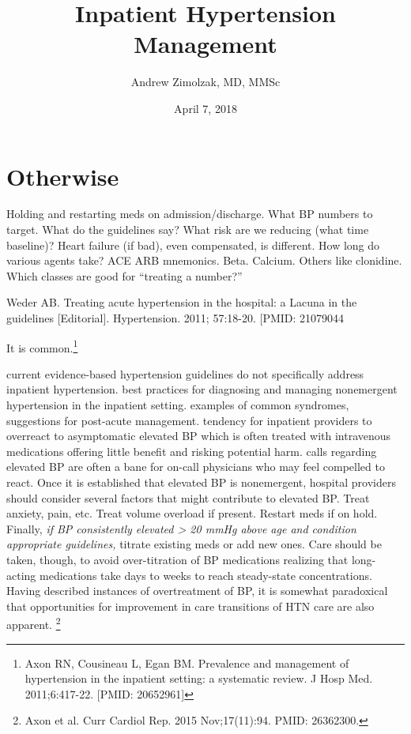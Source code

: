 \documentclass{tufte-handout}
\title{Inpatient Hypertension Management}
\author{Andrew Zimolzak, MD, MMSc}
\date{April 7, 2018}
\begin{document}
\maketitle











\section{Otherwise}

Holding and restarting meds on admission/discharge.
What BP numbers to target. What do the guidelines
say? What risk are we reducing (what time baseline)?
Heart failure (if bad), even compensated, is different.
How long do various agents take? ACE ARB mnemonics. Beta. Calcium.
Others like clonidine. Which classes are good for ``treating a number?''

Weder AB. Treating acute hypertension in the hospital: a Lacuna in the guidelines [Editorial]. Hypertension. 2011; 57:18-20. [PMID: 21079044

It is common.\footnote{Axon RN, Cousineau L, Egan BM. Prevalence and management of hypertension in the inpatient setting: a systematic review. J Hosp Med. 2011;6:417-22. [PMID: 20652961]}

current evidence-based hypertension guidelines do not specifically address inpatient hypertension. best practices for diagnosing and managing nonemergent hypertension in the inpatient setting. examples of common syndromes, suggestions for post-acute management. tendency for inpatient providers to overreact to asymptomatic elevated BP which is often treated with intravenous medications offering little benefit and risking potential harm.  calls regarding elevated BP are often a bane for on-call physicians who may feel compelled to react. Once it is established that elevated BP is nonemergent, hospital providers should consider several factors that might contribute to elevated BP. Treat anxiety, pain, etc. Treat volume overload if present. Restart meds if on hold. Finally, \emph{if BP consistently elevated > 20 mmHg above age and condition appropriate guidelines,} titrate existing meds or add new ones. Care should be taken, though, to avoid over-titration of BP medications realizing that long-acting medications take days to weeks to reach steady-state concentrations. Having described instances of overtreatment of BP, it is somewhat paradoxical that opportunities for improvement in care transitions of HTN care are also apparent. \footnote{Axon et al. Curr Cardiol Rep. 2015 Nov;17(11):94. PMID: 26362300.}
\end{document}

